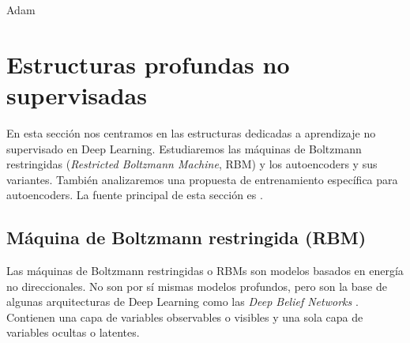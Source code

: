 \begin{algorithm}
\caption{Adam}
\label{alg:adam}
\begin{algorithmic}
  \REQUIRE{Tasas de decaimiento exponencial $\rho_{1}, \rho_2\in[0,1[$}
  \ENDWHILE
\end{algorithmic}
\end{algorithm}

\section{Estructuras profundas no
supervisadas}\label{estructuras-profundas-no-supervisadas}

En esta sección nos centramos en las estructuras dedicadas a aprendizaje no supervisado en Deep Learning. Estudiaremos las máquinas de Boltzmann restringidas (\textit{Restricted Boltzmann Machine}, RBM) y los autoencoders y sus variantes. También analizaremos una propuesta de entrenamiento específica para autoencoders. La fuente principal de esta sección es \textcite[capítulos 14 y 20]{goodfellow2016}.

\subsection{Máquina de Boltzmann restringida
(RBM)}\label{muxe1quina-de-boltzmann-restringidas-rbm}

Las máquinas de Boltzmann restringidas o RBMs son modelos basados en energía no direccionales. No son por sí mismas modelos profundos, pero son la base de algunas arquitecturas de Deep Learning como las \textit{Deep Belief Networks} \autocite{hinton2006dbn}. Contienen una capa de variables observables o visibles y una sola capa de variables ocultas o latentes.

